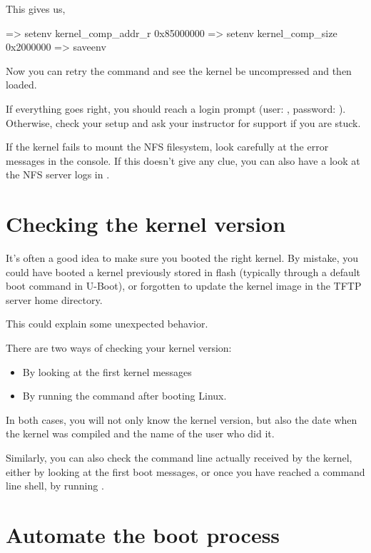 This gives us,

\begin{ubootinput}
=> setenv kernel_comp_addr_r 0x85000000
=> setenv kernel_comp_size 0x2000000
=> saveenv
\end{ubootinput}

Now you can retry the  command and see the kernel be uncompressed
and then loaded.

If everything goes right, you should reach a login prompt (user:
, password: ). Otherwise, check your setup and
ask your instructor for support if you are stuck.

If the kernel fails to mount the NFS filesystem, look carefully at the
error messages in the console. If this doesn't give any clue, you can
also have a look at the NFS server logs in .

\section{Checking the kernel version}

It's often a good idea to make sure you booted the right kernel.
By mistake, you could have booted a kernel previously stored in flash
(typically through a default boot command in U-Boot), or forgotten to
update the kernel image in the TFTP server home directory.

This could explain some unexpected behavior.

There are two ways of checking your kernel version:
\begin{itemize}
\item By looking at the first kernel messages
\item By running the  command after booting Linux.
\end{itemize}

In both cases, you will not only know the kernel version, but also
the date when the kernel was compiled and the name of the user who
did it.

Similarly, you can also check the command line actually received by
the kernel, either by looking at the first boot messages, or once you
have reached a command line shell, by running .

\section{Automate the boot process}

